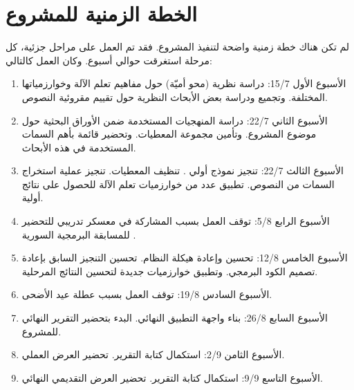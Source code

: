 \section{الخطة الزمنية للمشروع}
لم تكن هناك خطة زمنية واضحة لتنفيذ المشروع.
فقد تم العمل على مراحل جزئية، كل مرحلة استغرقت حوالي أسبوع.
وكان العمل كالتالي:
\begin{enumerate}
	\item 
	الأسبوع الأول 15/7:
	دراسة نظرية (محو أميّة) حول مفاهيم تعلم الآلة وخوارزمياتها المختلفة.
	وتجميع ودراسة بعض الأبحاث النظرية حول تقييم مقروئية النصوص.
	\item
	الأسبوع الثاني 22/7:
	دراسة المنهجيات المستخدمة ضمن الأوراق البحثية حول موضوع المشروع.
	وتأمين مجموعة المعطيات.
	وتحضير قائمة بأهم السمات المستخدمة في هذه الأبحاث.
	\item
	الأسبوع الثالث 22/7:
	تنجيز نموذج أولي .
	تنظيف المعطيات.
	تنجيز عملية استخراج السمات من النصوص.
	تطبيق عدد من خوارزميات تعلم الآلة للحصول على نتائج أولية.
	\item
	الأسبوع الرابع 5/8:
	توقف العمل بسبب المشاركة في معسكر تدريبي للتحضير للمسابقة البرمجية السورية .
	\item
	الأسبوع الخامس 12/8:
	تحسين وإعادة هيكلة النظام.
	تحسين التنجيز السابق بإعادة تصميم الكود البرمجي.
	وتطبيق خوارزميات جديدة لتحسين النتائج المرحلية.
	\item
	الأسبوع السادس 19/8:
	توقف العمل بسبب عطلة عيد الأضحى.
	\item
	الأسبوع السابع 26/8:
	بناء واجهة التطبيق النهائي.
	البدء بتحضير التقرير النهائي للمشروع.
	\item
	الأسبوع الثامن 2/9:
	استكمال كتابة التقرير.
	تحضير العرض العملي.
	\item
	الأسبوع التاسع 9/9:
	استكمال كتابة التقرير.
	تحضير العرض التقديمي النهائي.
\end{enumerate}








